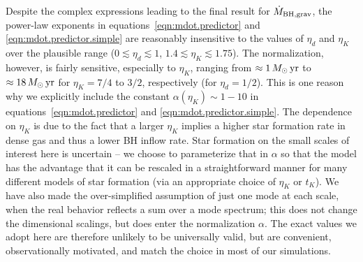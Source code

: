 \documentclass[11pt,a4paper]{article}
\begin{document}
Despite the complex expressions leading to the final result for $\dot
M_{\rm BH, grav}$, the power-law exponents in
equations~\ref{eqn:mdot.predictor} and \ref{eqn:mdot.predictor.simple}
are reasonably insensitive to the values of $\eta_{d}$ and $\eta_{K}$
over the plausible range ($0\lesssim\eta_{d}\lesssim1$, $1.4\lesssim
\eta_{K}\lesssim1.75$).  The normalization, however, is fairly
sensitive, especially to $\eta_{K}$, ranging from
$\approx1\,M_{\odot}\,{\rm yr}$ to $\approx 18\,M_{\odot}\,{\rm yr}$ for
$\eta_{K}=7/4$ to $3/2$, respectively (for $\eta_{d}=1/2$). This is
one reason why we explicitly include the constant
$\alpha(\eta_{K})\sim1-10$ in equations~\ref{eqn:mdot.predictor} and
\ref{eqn:mdot.predictor.simple}.  The dependence on $\eta_K$ is due to
the fact that a larger $\eta_K$ implies a higher star formation rate
in dense gas and thus a lower BH inflow rate. Star formation on the
small scales of interest here is uncertain -- we choose to
parameterize that in $\alpha$ so that the model has the advantage that
it can be rescaled in a straightforward manner for many different
models of star formation (via an appropriate choice of $\eta_K$ or
$t_K$). We have also made the over-simplified assumption of just one
mode at each scale, when the real behavior reflects a sum over a mode
spectrum; this does not change the dimensional scalings, but does
enter the normalization $\alpha$.  The exact values we adopt here are
therefore unlikely to be universally valid, but are convenient,
observationally motivated, and match the choice in most of our
simulations.
\end{document}
